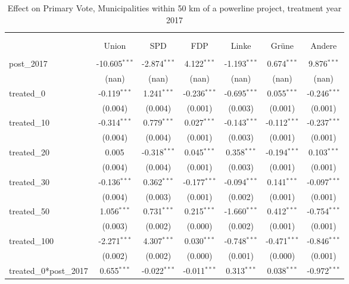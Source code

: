 \begin{table}[!htbp] \centering
  \caption{Effect on Primary Vote, Municipalities within 50 km of a powerline project, treatment year 2017}
\begin{tabular}{@{\extracolsep{5pt}}lcccccc}
\\[-1.8ex]\hline
\hline \\[-1.8ex]
\\[-1.8ex] & \multicolumn{1}{c}{Union} & \multicolumn{1}{c}{SPD} & \multicolumn{1}{c}{FDP} & \multicolumn{1}{c}{Linke} & \multicolumn{1}{c}{Grüne} & \multicolumn{1}{c}{Andere}  \\
\hline \\[-1.8ex]
 post_2017 & -10.605$^{***}$ & -2.874$^{***}$ & 4.122$^{***}$ & -1.193$^{***}$ & 0.674$^{***}$ & 9.876$^{***}$ \\
  & (nan) & (nan) & (nan) & (nan) & (nan) & (nan) \\
 treated_0 & -0.119$^{***}$ & 1.241$^{***}$ & -0.236$^{***}$ & -0.695$^{***}$ & 0.055$^{***}$ & -0.246$^{***}$ \\
  & (0.004) & (0.004) & (0.001) & (0.003) & (0.001) & (0.001) \\
 treated_10 & -0.314$^{***}$ & 0.779$^{***}$ & 0.027$^{***}$ & -0.143$^{***}$ & -0.112$^{***}$ & -0.237$^{***}$ \\
  & (0.004) & (0.004) & (0.001) & (0.003) & (0.001) & (0.001) \\
 treated_20 & 0.005$^{}$ & -0.318$^{***}$ & 0.045$^{***}$ & 0.358$^{***}$ & -0.194$^{***}$ & 0.103$^{***}$ \\
  & (0.004) & (0.004) & (0.001) & (0.003) & (0.001) & (0.001) \\
 treated_30 & -0.136$^{***}$ & 0.362$^{***}$ & -0.177$^{***}$ & -0.094$^{***}$ & 0.141$^{***}$ & -0.097$^{***}$ \\
  & (0.004) & (0.003) & (0.001) & (0.002) & (0.001) & (0.001) \\
 treated_50 & 1.056$^{***}$ & 0.731$^{***}$ & 0.215$^{***}$ & -1.660$^{***}$ & 0.412$^{***}$ & -0.754$^{***}$ \\
  & (0.003) & (0.002) & (0.000) & (0.002) & (0.001) & (0.001) \\
 treated_100 & -2.271$^{***}$ & 4.307$^{***}$ & 0.030$^{***}$ & -0.748$^{***}$ & -0.471$^{***}$ & -0.846$^{***}$ \\
  & (0.002) & (0.002) & (0.000) & (0.001) & (0.000) & (0.001) \\
 treated_0*post_2017 & 0.655$^{***}$ & -0.022$^{***}$ & -0.011$^{***}$ & 0.313$^{***}$ & 0.038$^{***}$ & -0.972$^{***}$ \\

\end{tabular}
\end{table}
